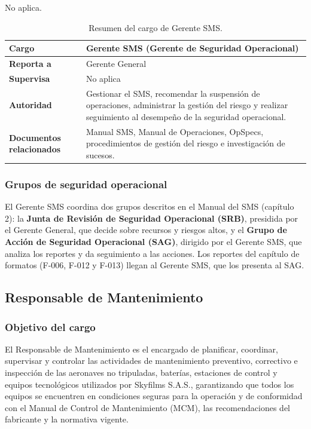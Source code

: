 No aplica.


\begin{table}[H]
\centering
\renewcommand{\arraystretch}{1.3}

\begin{tabularx}{\textwidth}{|p{4cm}|X|}
\hline
\textbf{Cargo} & Gerente SMS (Gerente de Seguridad Operacional) \\ \hline
\textbf{Reporta a} & Gerente General \\ \hline
\textbf{Supervisa} & No aplica \\ \hline
\textbf{Autoridad} & Gestionar el SMS, recomendar la suspensión de operaciones, administrar la gestión del riesgo y realizar seguimiento al desempeño de la seguridad operacional. \\ \hline
\textbf{Documentos relacionados} & Manual SMS, Manual de Operaciones, OpSpecs, procedimientos de gestión del riesgo e investigación de sucesos. \\ \hline
\end{tabularx}

\caption{Resumen del cargo de Gerente SMS.}


\subsubsection*{Grupos de seguridad operacional}
El Gerente SMS coordina dos grupos descritos en el Manual del SMS (capítulo 2): la \textbf{Junta de Revisión de Seguridad Operacional (SRB)}, presidida por el Gerente General, que decide sobre recursos y riesgos altos, y el \textbf{Grupo de Acción de Seguridad Operacional (SAG)}, dirigido por el Gerente SMS, que analiza los reportes y da seguimiento a las acciones. Los reportes del capítulo de formatos (F-006, F-012 y F-013) llegan al Gerente SMS, que los presenta al SAG.

\end{table}


\subsection{Responsable de Mantenimiento}

\subsubsection*{Objetivo del cargo}

El Responsable de Mantenimiento es el encargado de planificar, coordinar, supervisar y controlar las actividades de mantenimiento preventivo, correctivo e inspección de las aeronaves no tripuladas, baterías, estaciones de control y equipos tecnológicos utilizados por Skyfilms S.A.S., garantizando que todos los equipos se encuentren en condiciones seguras para la operación y de conformidad con el Manual de Control de Mantenimiento (MCM), las recomendaciones del fabricante y la normativa vigente.

